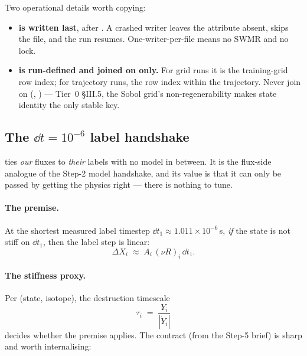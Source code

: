 Two operational details worth copying:

\begin{itemize}
\item \textbf{ is written last}, after . A
  crashed writer leaves the attribute absent,  skips
  the file, and the run resumes. One-writer-per-file means no SWMR and no lock.
\item \textbf{ is run-defined and joined on only.} For grid runs
  it is the training-grid row index; for trajectory runs, the row index within
  the trajectory. Never join on (, ) --- Tier~0 \S III.5,
  the Sobol grid's non-regenerability makes state identity the only stable key.
\end{itemize}

\subsection{The \texorpdfstring{$\dd t = 10^{-6}$}{dt = 1e-6} label handshake}
\label{sec:handshake}

 ties \emph{our} fluxes to \emph{their} labels with no
model in between. It is the flux-side analogue of the Step-2 model handshake,
and its value is that it can only be passed by getting the physics right ---
there is nothing to tune.

\paragraph{The premise.} At the shortest measured label timestep
$\dd t_1 \approx 1.011\times10^{-6}$\,s, \emph{if} the state is not stiff on
$\dd t_1$, then the label step is linear:
%
\begin{equation}
\Delta X_i \;\approx\; A_i\,(\nu R)_i\,\dd t_1 .
\label{eq:handshakepremise}
\end{equation}

\paragraph{The stiffness proxy.} Per (state, isotope), the destruction timescale
%
\begin{equation}
\tau_i \;=\; \frac{Y_i}{|\dot Y_i|}
\label{eq:tau}
\end{equation}
%
decides whether the premise applies. The contract (from the Step-5 brief) is
sharp and worth internalising:

